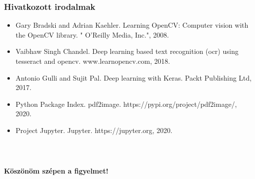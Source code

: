 \documentclass{beamer}
\begin{document}
\begin{frame}[fragile]
\frametitle{Hivatkozott irodalmak}

\begin{itemize}
    \item Gary Bradski and Adrian Kaehler. Learning OpenCV: Computer vision with the OpenCV library. " O’Reilly Media, Inc.", 2008.
    \item Vaibhaw Singh Chandel. Deep learning based text recognition (ocr) using tesseract and opencv. www.learnopencv.com, 2018.
    \item Antonio Gulli and Sujit Pal. Deep learning with Keras. Packt Publishing Ltd, 2017.
    \item Python Package Index. pdf2image. https://pypi.org/project/pdf2image/, 2020.
    \item Project Jupyter. Jupyter. https://jupyter.org, 2020.
\end{itemize}

\end{frame}

\begin{frame}[fragile]
\frametitle{\ }

\begin{center}

    \Large

    \textbf{Köszönöm szépen a figyelmet!}

    \bigskip

\end{center}

\end{frame}
\end{document}
